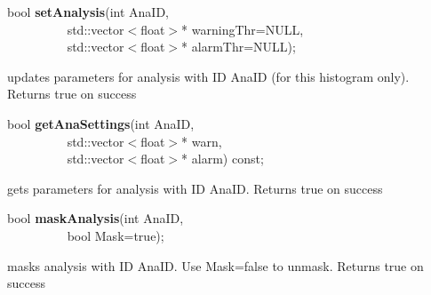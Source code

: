 \item    bool {\bf setAnalysis}(int AnaID,\\\mbox{}~~~~~~~~~ 
		   std::vector$<$float$>$* warningThr=NULL,\\\mbox{}~~~~~~~~~ 
		   std::vector$<$float$>$* alarmThr=NULL);

 updates parameters for analysis with ID AnaID (for this histogram only). Returns true on success


\item    bool {\bf getAnaSettings}(int AnaID,\\\mbox{}~~~~~~~~~
		      std::vector$<$float$>$* warn,\\\mbox{}~~~~~~~~~ 
		      std::vector$<$float$>$* alarm) const;

 gets parameters for analysis with ID AnaID. Returns true on success


\item    bool {\bf maskAnalysis}(int AnaID,\\\mbox{}~~~~~~~~~
		    bool Mask=true);

 masks analysis with ID AnaID. Use Mask=false to unmask. Returns true on success


